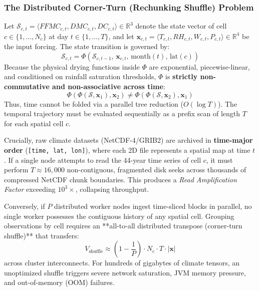 \documentclass[10pt,conference]{IEEEtran}
\begin{document}
\subsubsection{The Distributed Corner-Turn (Rechunking Shuffle) Problem}
Let $\mathcal{S}_{c,t} = \langle FFMC_{c,t}, DMC_{c,t}, DC_{c,t} \rangle \in \mathbb{R}^3$ denote the state vector of cell $c \in \{1, \dots, N_c\}$ at day $t \in \{1, \dots, T\}$, and let $\mathbf{x}_{c,t} = \langle T_{c,t}, RH_{c,t}, W_{c,t}, P_{c,t} \rangle \in \mathbb{R}^4$ be the input forcing. The state transition is governed by:
\begin{equation}
\label{eq:recurrence}
\mathcal{S}_{c,t} = \Phi\left(\mathcal{S}_{c,t-1},\, \mathbf{x}_{c,t},\, \text{month}(t),\, \text{lat}(c)\right)
\end{equation}
Because the physical drying functions inside $\Phi$ are exponential, piecewise-linear, and conditioned on rainfall saturation thresholds, $\Phi$ is \textbf{strictly non-commutative and non-associative across time}:
\begin{equation}
\Phi(\Phi(\mathcal{S}, \mathbf{x}_1), \mathbf{x}_2) \neq \Phi(\Phi(\mathcal{S}, \mathbf{x}_2), \mathbf{x}_1)
\end{equation}
Thus, time cannot be folded via a parallel tree reduction ($O(\log T)$). The temporal trajectory must be evaluated sequentially as a prefix scan of length $T$ for each spatial cell $c$.

Crucially, raw climate datasets (NetCDF-4/GRIB2) are archived in \textbf{time-major order} (\texttt{[time, lat, lon]}), where each 2D file represents a spatial map at time $t$. If a single node attempts to read the 44-year time series of cell $c$, it must perform $T \approx 16,000$ non-contiguous, fragmented disk seeks across thousands of compressed NetCDF chunk boundaries. This produces a \textit{Read Amplification Factor} exceeding $10^3\times$, collapsing throughput. 

Conversely, if $P$ distributed worker nodes ingest time-sliced blocks in parallel, no single worker possesses the contiguous history of any spatial cell. Grouping observations by cell requires an **all-to-all distributed transpose (corner-turn shuffle)** that transfers:
\begin{equation}
V_{\text{shuffle}} \approx \left(1 - \frac{1}{P}\right) \cdot N_c \cdot T \cdot |\mathbf{x}|
\end{equation}
across cluster interconnects. For hundreds of gigabytes of climate tensors, an unoptimized shuffle triggers severe network saturation, JVM memory pressure, and out-of-memory (OOM) failures.
\end{document}
